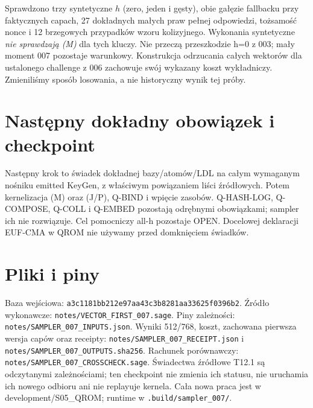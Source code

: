 \documentclass[11pt,a4paper]{article}
\newcommand{\code}[1]{\nolinkurl{#1}}
\begin{document}
Sprawdzono trzy syntetyczne $h$ (zero, jeden i gęsty), obie gałęzie
fallbacku przy faktycznych capach, 27 dokładnych małych praw pełnej
odpowiedzi, tożsamość nonce i 12 brzegowych przypadków wzoru kolizyjnego.
Wykonania syntetyczne \emph{nie sprawdzają (M)} dla tych kluczy.
Nie przeczą przeszkodzie h=0 z 003; mały moment 007 pozostaje warunkowy.
Konstrukcja odrzucania całych wektorów dla ustalonego challenge z 006
zachowuje swój wykazany koszt wykładniczy. Zmieniliśmy sposób losowania,
a nie historyczny wynik tej próby.

\section{Następny dokładny obowiązek i checkpoint}
Następny krok to świadek dokładnej bazy/atomów/LDL na całym wymaganym
nośniku emitted KeyGen, z właściwym powiązaniem liści źródłowych.
Potem kernelizacja (M) oraz (J/P), Q-BIND i wpięcie zasobów.
Q-HASH-LOG, Q-COMPOSE, Q-COLL i Q-EMBED pozostają odrębnymi obowiązkami;
sampler ich nie rozwiązuje. Cel pomocniczy all-h pozostaje OPEN.
Docelowej deklaracji EUF-CMA w QROM nie używamy przed domknięciem świadków.

\appendix\section{Pliki i piny}
Baza wejściowa: \code{a3c1181bb212e97aa43c3b8281aa33625f0396b2}.
Źródło wykonawcze: \code{notes/VECTOR_FIRST_007.sage}.
Piny zależności: \code{notes/SAMPLER_007_INPUTS.json}.
Wyniki 512/768, koszt, zachowana pierwsza wersja capów oraz receipty:
\code{notes/SAMPLER_007_RECEIPT.json} i \code{notes/SAMPLER_007_OUTPUTS.sha256}.
Rachunek porównawczy: \code{notes/SAMPLER_007_CROSSCHECK.sage}.
Świadectwa źródłowe T12.1 są odczytanymi zależnościami; ten checkpoint
nie zmienia ich statusu, nie uruchamia ich nowego odbioru ani nie replayuje kernela.
Cała nowa praca jest w development/S05\_QROM; runtime w \code{.build/sampler_007/}.
\end{document}
